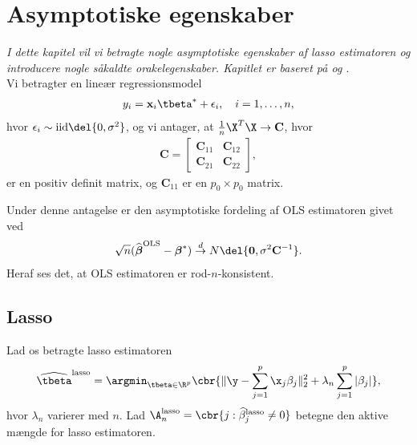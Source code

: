 \chapter{Asymptotiske egenskaber} \label{ch:asymptotics}
\textit{I dette kapitel vil vi betragte nogle asymptotiske egenskaber af lasso estimatoren og introducere nogle såkaldte orakelegenskaber.
Kapitlet er baseret på \cite{adaptive_lasso} og \cite{adaptive_lasso_knight}}. \\[4mm]
%


Vi betragter en lineær regressionsmodel 
\begin{align*}
y_i= \mathbf{x}_i \tbeta^* + \epsilon_i, \quad i = 1, \ldots, n,
\end{align*}
hvor \(\epsilon_i \sim \text{iid} \del{0, \sigma^2}\), og vi antager, at \(\frac{1}{n} \X^T \X \rightarrow \textbf{C}\), hvor
\begin{align*}
\textbf{C} = 
\begin{bmatrix}
\textbf{C}_{11}& \textbf{C}_{12}\\
\textbf{C}_{21}& \textbf{C}_{22}
\end{bmatrix},
\end{align*}
er en positiv definit matrix, og $\textbf{C}_{11}$ er en $p_0 \times p_0$ matrix. 

Under denne antagelse er den asymptotiske fordeling af OLS estimatoren givet ved
\begin{align*}
\sqrt{n}(\widehat{\boldsymbol{\beta}}^{\text{OLS}}-\boldsymbol{\beta}^*) \overset{d}{\rightarrow} N \del{\mathbf{0},\sigma^2 \mathbf{C}^{-1}}.
\end{align*}
Heraf ses det, at OLS estimatoren er rod-\(n\)-konsistent.

\section{Lasso}
Lad os betragte lasso estimatoren
\begin{align*}
\widehat{\tbeta}^\text{lasso} = \argmin_{\tbeta \in \R^p} \cbr{ \Vert \y - \sum_{j=1}^p \x_j \beta_j \Vert_2^2 + \lambda_n \sum_{j=1}^p \vert \beta_j \vert},
\end{align*}
hvor \(\lambda_n\) varierer med \(n\).
Lad \(\A_n^\text{lasso} = \cbr{j : \widehat{\beta}_j^\text{lasso} \neq 0}\) betegne den aktive mængde for lasso estimatoren.

